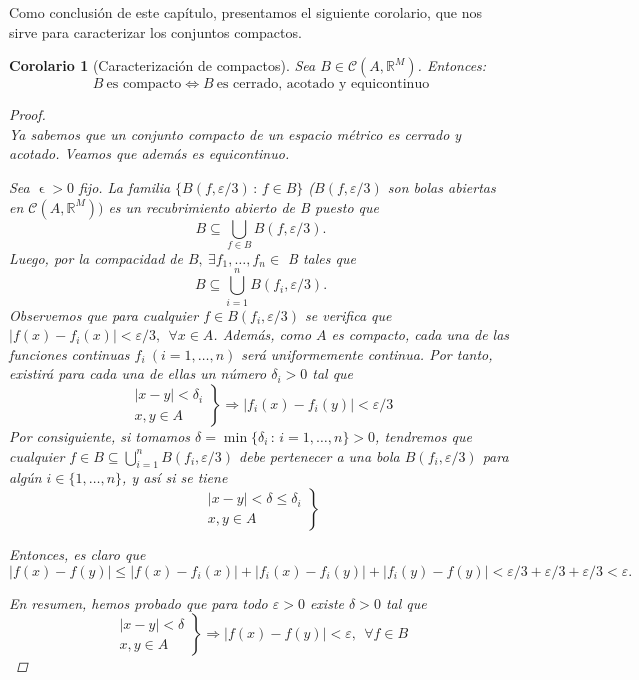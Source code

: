 \documentclass[11pt, a4paper]{article}
\let\epsilon\upvarepsilon
\theoremstyle{theorem-style}
\newtheorem{ncor}{Corolario}[section]
\theoremstyle{definition-style}
\theoremstyle{remark-style}
\theoremstyle{example-style}
\begin{document}
Como conclusión de este capítulo, presentamos el siguiente corolario, que nos sirve para caracterizar los conjuntos compactos.

\begin{ncor}[Caracterización de compactos] Sea $B \in \mathcal{C}(A,\mathbb{R}^M)$. Entonces: $$B\ \text{es compacto} \iff B \ \text{es cerrado, acotado y equicontinuo}$$

\begin{proof} \hfill \\
	\boxed{\Rightarrow} Ya sabemos que un conjunto compacto de un espacio métrico es cerrado y acotado. Veamos que además es equicontinuo.
	
Sea $\epsilon >0$ fijo. La familia $\{ B(f, \varepsilon/3) \, : \, f\in B\}$ ($B(f, \varepsilon/3)$ son bolas abiertas en $\mathcal{C}(A, \mathbb{R}^M))$ es un recubrimiento abierto de B puesto que $$B\subseteq \bigcup_{f\in B} B(f, \varepsilon/3).$$
Luego, por la compacidad de $B,\ \exists f_1, \dots, f_n \in$ B tales que $$B \subseteq \displaystyle \bigcup_{i=1}^n B(f_i, \varepsilon/3).$$
Observemos que para cualquier $f\in B(f_i, \varepsilon/3)$ se verifica que
$|f(x)-f_i(x)| < \varepsilon/3 , \ \ \forall x\in A$. Además, como $A$ es compacto, cada una de las funciones continuas $f_i \ (i=1,\dots,n)$ será uniformemente continua. Por tanto, existirá para cada una de ellas un número $\delta_i>0$ tal que $$\left. \begin{array}{c} |x-y|<\delta_i \\ x,y\in A \end{array}  \right\} \Rightarrow |f_i(x)-f_i(y)| <\varepsilon/3$$
Por consiguiente, si tomamos $\delta = \min \{\delta_i \, :\, i=1,\dots,n\} >0$, tendremos que cualquier $f\in B \subseteq \bigcup_{i=1}^n B(f_i, \varepsilon/3)$ debe pertenecer a una bola $B(f_i, \varepsilon/3)$ para algún $i\in\{1,\dots ,n\}$, y así si se tiene $$\left. \begin{array}{c} |x-y|<\delta \leq \delta_i \\ x,y\in A \end{array}  \right\}$$ 

Entonces, es claro que $\displaystyle |f(x)-f(y)| \le |f(x)-f_i(x)|+|f_i(x)-f_i(y)|+|f_i(y)-f(y)| < \varepsilon/3+\varepsilon/3+\varepsilon/3<\varepsilon.$

En resumen, hemos probado que para todo $\varepsilon >0$ existe $\delta >0$ tal que $$ \left. \begin{array}{c} |x-y|<\delta  \\ x,y\in A \end{array}  \right\} \Rightarrow |f(x)-f(y)| <\varepsilon , \ \ \forall f\in B$$


\end{proof}
\end{ncor}
\end{document}
